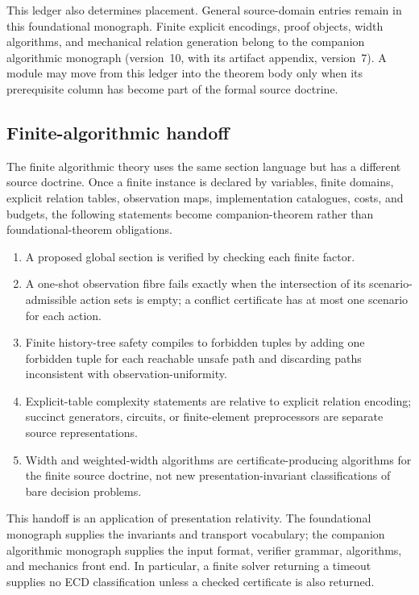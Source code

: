 \documentclass[11pt]{article}
\theoremstyle{plain}
\theoremstyle{definition}
\theoremstyle{remark}
\begin{document}
This ledger also determines placement. General source-domain entries remain in
this foundational monograph. Finite explicit encodings, proof objects, width
algorithms, and mechanical relation generation belong to the companion
algorithmic monograph (version~10, with its artifact appendix, version~7).
A module may move from this ledger into the theorem body
only when its prerequisite column has become part of the formal source doctrine.

\subsection{Finite-algorithmic handoff}
\label{subsec:finite-algorithmic-handoff}

The finite algorithmic theory uses the same section language but has a different
source doctrine. Once a finite instance is declared by variables, finite domains,
explicit relation tables, observation maps, implementation catalogues, costs,
and budgets, the following statements become companion-theorem rather than
foundational-theorem obligations.
\begin{enumerate}[label=(\roman*)]
\item A proposed global section is verified by checking each finite factor.
\item A one-shot observation fibre fails exactly when the intersection of its
scenario-admissible action sets is empty; a conflict certificate has at most one
scenario for each action.
\item Finite history-tree safety compiles to forbidden tuples by adding one
forbidden tuple for each reachable unsafe path and discarding paths inconsistent
with observation-uniformity.
\item Explicit-table complexity statements are relative to explicit relation
encoding; succinct generators, circuits, or finite-element preprocessors are
separate source representations.
\item Width and weighted-width algorithms are certificate-producing algorithms
for the finite source doctrine, not new presentation-invariant classifications of
bare decision problems.
\end{enumerate}

This handoff is an application of presentation relativity. The foundational
monograph supplies the invariants and transport vocabulary; the companion
algorithmic monograph supplies the input format, verifier grammar, algorithms,
and mechanics front end. In particular, a finite solver returning a timeout supplies no ECD
classification unless a checked certificate is also returned.
\end{document}
